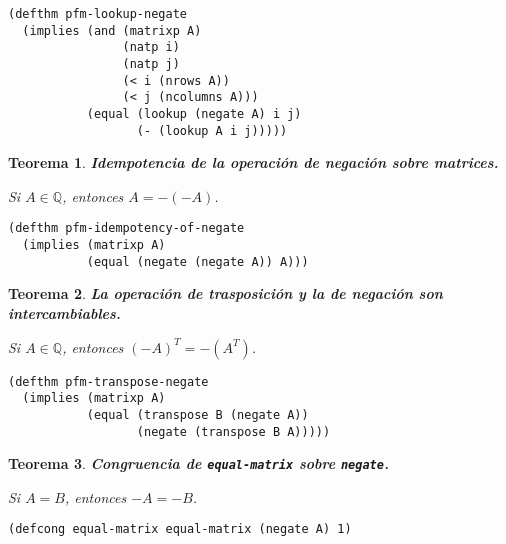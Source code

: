 \documentclass[a4paper,10pt]{article}
\newcommand{\Q}[1]{#1 \in \mathbb{Q}}
\newtheorem{teor}{{Teorema}}
\begin{document}
\begin{lstlisting}[language=clips]
(defthm pfm-lookup-negate
  (implies (and (matrixp A)
                (natp i)
                (natp j)
                (< i (nrows A))
                (< j (ncolumns A)))
           (equal (lookup (negate A) i j)
                  (- (lookup A i j)))))
\end{lstlisting}

\par \vspace{16pt}

\begin{teor} \textbf{Idempotencia de la operación de negación sobre matrices.}\vspace{8pt}\par
Si $\Q{A}$, entonces $A = -(-A)$.
\end{teor}

\begin{lstlisting}[language=clips]
(defthm pfm-idempotency-of-negate
  (implies (matrixp A)
           (equal (negate (negate A)) A)))
\end{lstlisting}

\par \vspace{16pt}

\begin{teor} \textbf{La operación de trasposición y la de negación son intercambiables.}\vspace{8pt}\par
Si $\Q{A}$, entonces $(-A)^T = -(A^T)$.
\end{teor}

\begin{lstlisting}[language=clips]
(defthm pfm-transpose-negate
  (implies (matrixp A)
           (equal (transpose B (negate A))
                  (negate (transpose B A)))))
\end{lstlisting}

\par \vspace{16pt}

\begin{teor} \textbf{Congruencia de \texttt{equal-matrix} sobre \texttt{negate}.}\vspace{8pt}\par
Si $A = B$, entonces $-A = -B$.
\end{teor}

\begin{lstlisting}[language=clips]
(defcong equal-matrix equal-matrix (negate A) 1)
\end{lstlisting}
\end{document}
